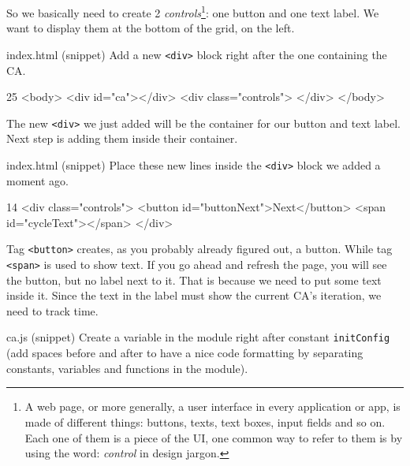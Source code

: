 So we basically need to create 2
\textit{controls}\footnote{A web page, or more generally, a user interface in every application or app, is made
of different things: buttons, texts, text boxes, input fields and so on. Each one of them is a piece of the UI,
one common way to refer to them is by using the word: \textit{control} in design jargon.}: one button and
one text label. We want to display them at the bottom of the grid, on the left.

\begin{programcode}{index.html (snippet)}
Add a new \texttt{<div>} block right after the one containing the CA.
\begin{codehtmlh1}{2}{5}
<body>
  <div id="ca"></div>
  <div class="controls">
  </div>
</body>
\end{codehtmlh1}
\end{programcode}

The new \texttt{<div>} we just added will be the container for our button and text label. Next step
is adding them inside their container.

\begin{programcode}{index.html (snippet)}
Place these new lines inside the \texttt{<div>} block we added a moment ago.
\begin{codehtmlh1}{1}{4}
<div class="controls">
  <button id="buttonNext">Next</button>
  <span id="cycleText"></span>
</div>
\end{codehtmlh1}
\end{programcode}

Tag \texttt{<button>} creates, as you probably already figured out, a button. While tag \texttt{<span>}
is used to show text. If you go ahead and refresh the page, you will see the button, but no
label next to it. That is because we need to put some text inside it. Since the text in the label
must show the current CA's iteration, we need to track time.

\begin{programcode}{ca.js (snippet)}
Create a variable in the module right after constant \texttt{initConfig} (add spaces before and after to
have a nice code formatting by separating constants, variables and functions in the module).
\begin{codeh1}{3}{5}
const cellsize = 20; // In px
const initConfig = ["3:4", "3:5", "4:3", "4:4", "5:4"];

let t = 0; // Cycles (time)

function create() {
\end{codeh1}
\end{programcode}


